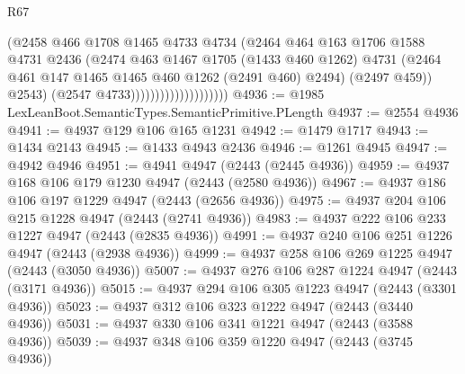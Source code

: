 \begin{lexlean}{R67}
\begin{coremodule}
                                        (@2458
                                          @466
                                          @1708
                                          @1465
                                          @4733
                                          @4734
                                          (@2464
                                            @464
                                            @163
                                            @1706
                                            @1588
                                            @4731
                                            @2436
                                            (@2474
                                              @463
                                              @1467
                                              @1705
                                              (@1433 @460 @1262)
                                              @4731
                                              (@2464
                                                @461
                                                @147
                                                @1465
                                                @1465
                                                @460
                                                @1262
                                                (@2491 @460)
                                                @2494)
                                              (@2497 @459))
                                            @2543)
                                          (@2547 @4733))))))))))))))))))))
@4936 := @1985 LexLeanBoot.SemanticTypes.SemanticPrimitive.PLength
@4937 := @2554 @4936
@4941 := @4937 @129 @106 @165 @1231
@4942 := @1479 @1717
@4943 := @1434 @2143
@4945 := @1433 @4943 @2436
@4946 := @1261 @4945
@4947 := @4942 @4946
@4951 := @4941 @4947 (@2443 (@2445 @4936))
@4959 := @4937 @168 @106 @179 @1230 @4947 (@2443 (@2580 @4936))
@4967 := @4937 @186 @106 @197 @1229 @4947 (@2443 (@2656 @4936))
@4975 := @4937 @204 @106 @215 @1228 @4947 (@2443 (@2741 @4936))
@4983 := @4937 @222 @106 @233 @1227 @4947 (@2443 (@2835 @4936))
@4991 := @4937 @240 @106 @251 @1226 @4947 (@2443 (@2938 @4936))
@4999 := @4937 @258 @106 @269 @1225 @4947 (@2443 (@3050 @4936))
@5007 := @4937 @276 @106 @287 @1224 @4947 (@2443 (@3171 @4936))
@5015 := @4937 @294 @106 @305 @1223 @4947 (@2443 (@3301 @4936))
@5023 := @4937 @312 @106 @323 @1222 @4947 (@2443 (@3440 @4936))
@5031 := @4937 @330 @106 @341 @1221 @4947 (@2443 (@3588 @4936))
@5039 := @4937 @348 @106 @359 @1220 @4947 (@2443 (@3745 @4936))

\end{coremodule}
\end{lexlean}
